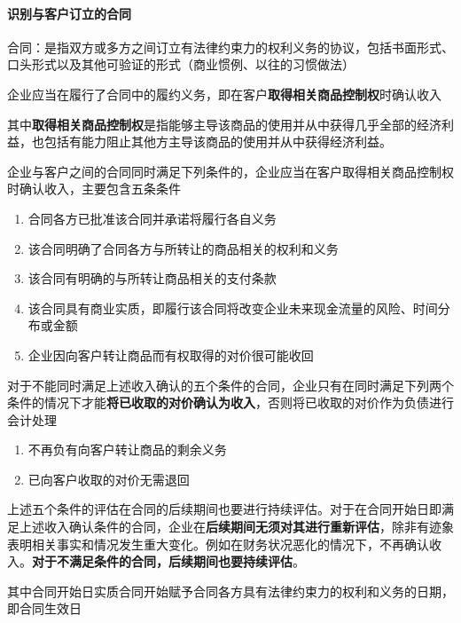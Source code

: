 \documentclass[UTF8,12pt]{ctexart}
\numberwithin{equation}{section} %
\numberwithin{figure}{section}
\numberwithin{table}{section}
\begin{document}
	\paragraph{识别与客户订立的合同}
	合同：是指双方或多方之间订立有法律约束力的权利义务的协议，包括书面形式、口头形式以及其他可验证的形式（商业惯例、以往的习惯做法）
	
	企业应当在履行了合同中的履约义务，即在客户\textbf{取得相关商品控制权}时确认收入
	
	其中\textbf{取得相关商品控制权}是指能够主导该商品的使用并从中获得几乎全部的经济利益，也包括有能力阻止其他方主导该商品的使用并从中获得经济利益。
	
	企业与客户之间的合同同时满足下列条件的，企业应当在客户取得相关商品控制权时确认收入，主要包含五条条件
	\begin{enumerate}
		\item 合同各方已批准该合同并承诺将履行各自义务
		
		\item 该合同明确了合同各方与所转让的商品相关的权利和义务
		
		\item 该合同有明确的与所转让商品相关的支付条款
		
		\item 该合同具有商业实质，即履行该合同将改变企业未来现金流量的风险、时间分布或金额
		
		\item 企业因向客户转让商品而有权取得的对价很可能收回
	\end{enumerate}
	
	对于不能同时满足上述收入确认的五个条件的合同，企业只有在同时满足下列两个条件的情况下才能\textbf{将已收取的对价确认为收入}，否则将已收取的对价作为负债进行会计处理
	\begin{enumerate}
		\item 不再负有向客户转让商品的剩余义务
		
		\item 已向客户收取的对价无需退回
	\end{enumerate}

	上述五个条件的评估在合同的后续期间也要进行持续评估。对于在合同开始日即满足上述收入确认条件的合同，企业在\textbf{后续期间无须对其进行重新评估}，除非有迹象表明相关事实和情况发生重大变化。例如在财务状况恶化的情况下，不再确认收入。\textbf{对于不满足条件的合同，后续期间也要持续评估}。
	
	其中合同开始日实质合同开始赋予合同各方具有法律约束力的权利和义务的日期，即合同生效日
	
\end{document}
